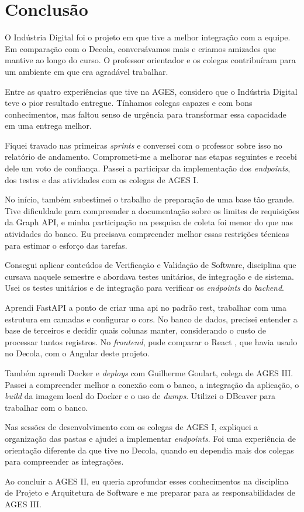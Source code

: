 \section[Conclusão]{Conclusão}

O Indústria Digital foi o projeto em que tive a melhor integração com a equipe.
Em comparação com o Decola, conversávamos mais e criamos amizades que mantive
ao longo do curso. O professor orientador e os colegas contribuíram para um
ambiente em que era agradável trabalhar.

Entre as quatro experiências que tive na AGES, considero que o Indústria
Digital teve o pior resultado entregue.
Tínhamos colegas capazes e com bons conhecimentos, mas faltou senso de urgência
para transformar essa capacidade em uma entrega melhor.

Fiquei travado nas
primeiras \textit{sprints} e conversei com o professor sobre isso no relatório
de andamento. Comprometi-me a melhorar nas etapas seguintes e recebi dele um
voto de confiança. Passei a participar da implementação dos \textit{endpoints},
dos testes e das atividades com os colegas de AGES I.

No início, também subestimei o trabalho de
preparação de uma base tão grande. Tive dificuldade para compreender a
documentação sobre os limites de requisições da Graph API, e minha participação
na pesquisa de coleta foi menor do que nas atividades do banco. Eu precisava
compreender melhor essas restrições técnicas para estimar o esforço das tarefas.

Consegui aplicar conteúdos de Verificação e Validação de Software, disciplina
que cursava naquele semestre e abordava testes unitários, de integração e
de sistema. Usei os testes unitários e de integração para verificar os
\textit{endpoints} do \textit{backend}.

Aprendi FastAPI a ponto de criar uma \ac{api} no padrão \ac{rest}, trabalhar com uma
estrutura em camadas e configurar o \ac{cors}. No banco de dados, precisei
entender a base de terceiros e decidir quais colunas manter, considerando o
custo de processar tantos registros. No \textit{frontend}, pude comparar o React
\cite{react-docs}, que havia usado no Decola, com o Angular deste projeto.

Também aprendi Docker e \textit{deploys} com Guilherme Goulart, colega de AGES III.
Passei a compreender melhor a conexão com o banco, a integração da aplicação,
o \textit{build} da imagem local do Docker e o uso de \textit{dumps}. Utilizei o
DBeaver \cite{dbeaver-docs} para trabalhar com o banco.

Nas sessões de desenvolvimento com os colegas de AGES I, expliquei a organização
das pastas e ajudei a implementar \textit{endpoints}. Foi uma experiência de
orientação diferente da que tive no Decola, quando eu dependia mais dos colegas
para compreender as integrações.

Ao concluir a AGES II, eu queria aprofundar esses conhecimentos na disciplina
de Projeto e Arquitetura de Software e me preparar para as responsabilidades
de AGES III.
